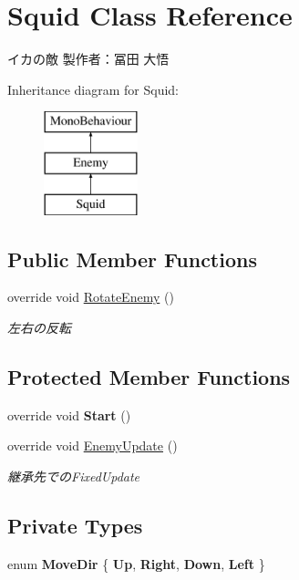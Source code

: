 \hypertarget{class_squid}{}\section{Squid Class Reference}
\label{class_squid}


イカの敵 製作者：冨田 大悟  


Inheritance diagram for Squid\+:\begin{figure}[H]
\begin{center}
\leavevmode
\includegraphics[height=3.000000cm]{class_squid}
\end{center}
\end{figure}
\subsection*{Public Member Functions}
\begin{DoxyCompactItemize}
\item 
override void \hyperlink{class_squid_a7350ce67466554aa0c46c9da7c5e6da2}{Rotate\+Enemy} ()
\begin{DoxyCompactList}\small\item\em 左右の反転 \end{DoxyCompactList}\end{DoxyCompactItemize}
\subsection*{Protected Member Functions}
\begin{DoxyCompactItemize}
\item 
\mbox{\label{class_squid_a79b5ca18135582d01df66f2cce0be082}} 
override void {\bfseries Start} ()
\item 
override void \hyperlink{class_squid_ab737cee06933e0631c45bb7fef86fe6b}{Enemy\+Update} ()
\begin{DoxyCompactList}\small\item\em 継承先での\+Fixed\+Update \end{DoxyCompactList}\end{DoxyCompactItemize}
\subsection*{Private Types}
\begin{DoxyCompactItemize}
\item 
\mbox{\label{class_squid_a5205a9033f57c9b0dfcd1af955a5a6a6}} 
enum {\bfseries Move\+Dir} \{ {\bfseries Up}, 
{\bfseries Right}, 
{\bfseries Down}, 
{\bfseries Left}
 \}
\end{DoxyCompactItemize}
